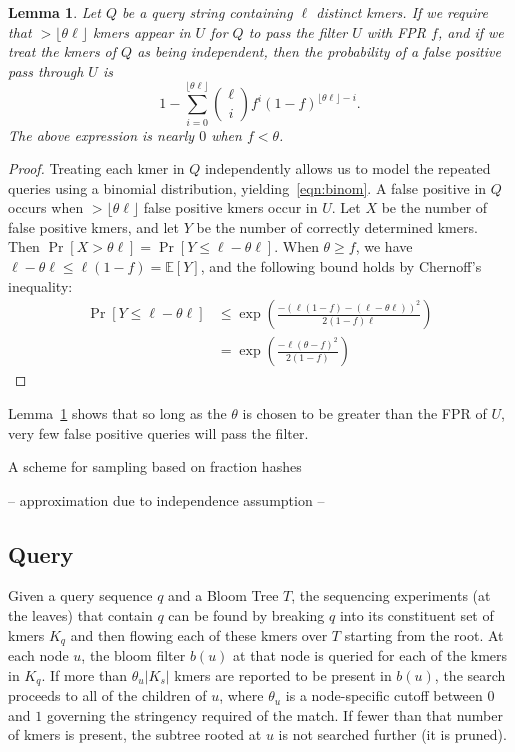\documentclass[11pt]{article}
\newtheorem{lem}{Lemma}
\newcommand\EE{\mathbb{E}}
\begin{document}
\begin{lem}\label{lem:query}
Let $Q$ be a query string containing $\ell$ distinct kmers. If we require that $>\lfloor\theta\ell\rfloor$ kmers appear in $U$ for $Q$ to pass the filter $U$ with FPR $f$, and if we treat the kmers of $Q$ as being independent, then the probability of a false positive pass through $U$ is
\begin{equation}\label{eqn:binom}
1 - \sum_{i=0}^{\lfloor \theta\ell\rfloor} \binom{\ell}{i}f^i(1-f)^{\lfloor\theta\ell\rfloor - i}. 
\end{equation}
The above expression is nearly $0$ when $f < \theta$.  
\end{lem}
\begin{proof}
Treating each kmer in $Q$ independently allows us to model the repeated queries using a binomial distribution, yielding~\eqref{eqn:binom}. A false positive in $Q$ occurs when $> \lfloor \theta \ell \rfloor$ false positive kmers occur in $U$. Let $X$ be the number of false positive kmers, and let $Y$ be the number of correctly determined kmers. Then
$\Pr[X > \theta\ell] = \Pr[Y \leq \ell - \theta\ell]$.
When $\theta \geq f$, we have $\ell - \theta\ell \leq \ell (1-f) = \EE[Y]$, and the following bound holds by Chernoff's inequality:
\begin{align}
\Pr[Y \leq \ell - \theta\ell] 
	&\leq \exp\left(\frac{-(\ell(1-f) - (\ell-\theta\ell))^2}{2(1-f)\ell}\right)\\
	&= \exp\left(\frac{-\ell(\theta - f)^2}{2(1-f)}\right)
\end{align}
\end{proof}

Lemma~\ref{lem:query} shows that so long as the $\theta$ is chosen to be greater than the FPR of $U$, very few false positive queries will pass the filter.


A scheme for sampling based on fraction hashes

-- approximation due to independence assumption
-- 

\subsection{Query}

Given a query sequence $q$ and a Bloom Tree $T$, the sequencing experiments (at the leaves) that contain $q$ can be found by breaking $q$ into its constituent set of kmers $K_q$ and then flowing each of these kmers over $T$ starting from the root. At each node $u$, the bloom filter $b(u)$ at that node is queried for each of the kmers in $K_q$. If more than $\theta_u|K_s|$ kmers are reported to be present in $b(u)$, the search proceeds to all of the children of $u$, where $\theta_u$ is a node-specific cutoff between $0$ and $1$ governing the stringency required of the match. If fewer than that number of kmers is present, the subtree rooted at $u$ is not searched further (it is pruned). 
\end{document}
